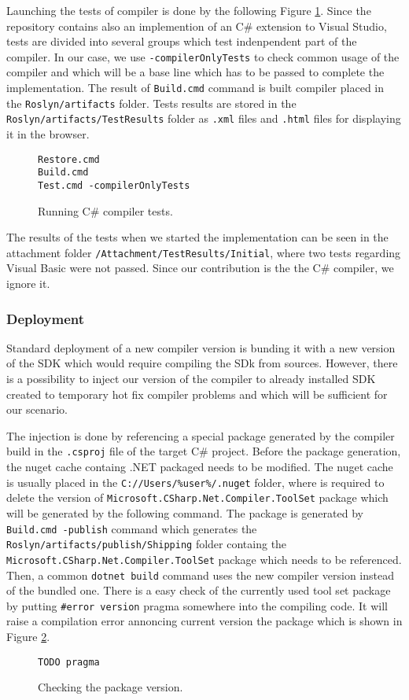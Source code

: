 Launching the tests of compiler is done by the following Figure \ref{img65:runTests}.
Since the repository contains also an implemention of an C\# extension to Visual Studio, tests are divided into several groups which test indenpendent part of the compiler.
In our case, we use \texttt{-compilerOnlyTests} to check common usage of the compiler and which will be a base line which has to be passed to complete the implementation.
The result of \texttt{Build.cmd} command is built compiler placed in the \texttt{Roslyn/artifacts} folder.
Tests results are stored in the \texttt{Roslyn/artifacts/TestResults} folder as \texttt{.xml} files and \texttt{.html} files for displaying it in the browser.
\begin{figure}[h]
\begin{lstlisting}
Restore.cmd
Build.cmd
Test.cmd -compilerOnlyTests
\end{lstlisting}
\caption{Running C\# compiler tests.}
\label{img65:runTests}
\end{figure}
\par
The results of the tests when we started the implementation can be seen in the attachment folder \texttt{/Attachment/TestResults/Initial}, where two tests regarding Visual Basic were not passed.
Since our contribution is the the C\# compiler, we ignore it.

\subsubsection{Deployment}

Standard deployment of a new compiler version is bunding it with a new version of the SDK which would require compiling the SDk from sources.
However, there is a possibility to inject our version of the compiler to already installed SDK created to temporary hot fix compiler problems and which will be sufficient for our scenario.
\par
The injection is done by referencing a special package generated by the compiler build in the \texttt{.csproj} file of the target C\# project.
Before the package generation, the nuget cache containg .NET packaged needs to be modified.
The nuget cache is usually placed in the \texttt{C://Users/\%user\%/.nuget} folder, where is required to delete the version of \texttt{Microsoft.CSharp.Net.Compiler.ToolSet} package which will be generated by the following command.
The package is generated by \texttt{Build.cmd -publish} command which generates the \texttt{Roslyn/artifacts/publish/Shipping} folder containg the \texttt{Microsoft.CSharp.Net.Compiler.ToolSet} package which needs to be referenced.
Then, a common \texttt{dotnet build} command uses the new compiler version instead of the bundled one.
There is a easy check of the currently used tool set package by putting \texttt{\#error version} pragma somewhere into the compiling code.
It will raise a compilation error annoncing current version the package which is shown in Figure \ref{img66:pragma}.
\begin{figure}[h]
\begin{lstlisting}
TODO pragma
\end{lstlisting}
\caption{Checking the package version.}
\label{img66:pragma}
\end{figure}

